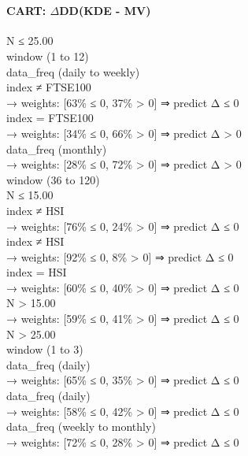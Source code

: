 \
\paragraph{CART: $\Delta$DD(KDE - MV)}

\begin{flushleft}
\ttfamily %
N ≤ 25.00 \\
\quad window (1 to 12) \\
\quad \quad data\_freq (daily to weekly) \\
\quad \quad \quad index ≠ FTSE100 \\
\quad \quad \quad \quad → weights: [63\% ≤ 0, 37\% > 0] ⇒ predict Δ ≤ 0 \\
\quad \quad \quad index = FTSE100 \\
\quad \quad \quad \quad → weights: [34\% ≤ 0, 66\% > 0] ⇒ predict Δ > 0 \\
\quad \quad data\_freq (monthly) \\
\quad \quad \quad \quad → weights: [28\% ≤ 0, 72\% > 0] ⇒ predict Δ > 0 \\
\quad window (36 to 120) \\
\quad \quad N ≤ 15.00 \\
\quad \quad \quad index ≠ HSI \\
\quad \quad \quad \quad → weights: [76\% ≤ 0, 24\% > 0] ⇒ predict Δ ≤ 0 \\
\quad \quad \quad index ≠ HSI \\
\quad \quad \quad \quad → weights: [92\% ≤ 0, 8\% > 0] ⇒ predict Δ ≤ 0 \\
\quad \quad \quad index = HSI \\
\quad \quad \quad \quad → weights: [60\% ≤ 0, 40\% > 0] ⇒ predict Δ ≤ 0 \\
\quad \quad N > 15.00 \\
\quad \quad \quad \quad → weights: [59\% ≤ 0, 41\% > 0] ⇒ predict Δ ≤ 0 \\
N > 25.00 \\
\quad window (1 to 3) \\
\quad \quad data\_freq (daily) \\
\quad \quad \quad \quad → weights: [65\% ≤ 0, 35\% > 0] ⇒ predict Δ ≤ 0 \\
\quad \quad data\_freq (daily) \\
\quad \quad \quad \quad → weights: [58\% ≤ 0, 42\% > 0] ⇒ predict Δ ≤ 0 \\
\quad \quad data\_freq (weekly to monthly) \\
\quad \quad \quad \quad → weights: [72\% ≤ 0, 28\% > 0] ⇒ predict Δ ≤ 0 \\

\end{flushleft}
